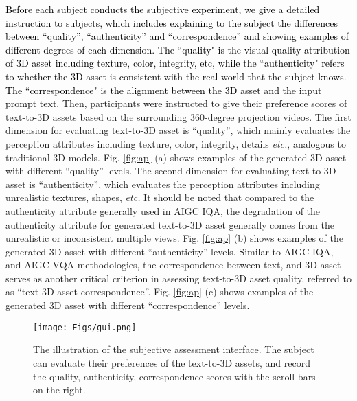 \textcolor{black}{Before each subject conducts the subjective experiment, we give a detailed instruction to subjects, which includes explaining to the subject the differences between ``quality'', ``authenticity'' and ``correspondence'' and showing examples of different degrees of each dimension. The ``quality" is the visual quality attribution of 3D asset including texture, color, integrity, etc, while the ``authenticity" refers to whether the 3D asset is consistent with the real world that the subject knows. The ``correspondence" is the alignment between the 3D asset and the input prompt text.} Then, participants were instructed to give their preference scores of text-to-3D assets based on the surrounding 360-degree projection videos. The first dimension for evaluating text-to-3D asset is ``quality'', which mainly evaluates the perception attributes including texture, color, integrity, details \textit{etc.}, analogous to traditional 3D models. Fig. \ref{fig:ap} (a) shows examples of the generated 3D asset with different ``quality'' levels. The second dimension for evaluating text-to-3D asset is ``authenticity'', which evaluates the perception attributes including unrealistic textures, shapes, \textit{etc.} It should be noted that compared to the authenticity attribute generally used in AIGC IQA, the degradation of the authenticity attribute for generated text-to-3D asset generally comes from the unrealistic or inconsistent multiple views. Fig. \ref{fig:ap} (b) shows examples of the generated 3D asset with different ``authenticity'' levels. Similar to AIGC IQA, and AIGC VQA methodologies, the correspondence between text, and 3D asset serves as another critical criterion in assessing text-to-3D asset quality, referred to as ``text-3D asset correspondence''. Fig. \ref{fig:ap} (c) shows examples of the generated 3D asset with different ``correspondence'' levels.
\begin{figure}[t]
    \centering
    \texttt{[image: Figs/gui.png]}
    \caption{The illustration of the subjective assessment interface. The subject can evaluate their preferences of the text-to-3D assets, and record the quality, authenticity, correspondence scores with the scroll bars on the right.}
    \label{fig:gui}
    \vspace{-0.5cm}
\end{figure}

